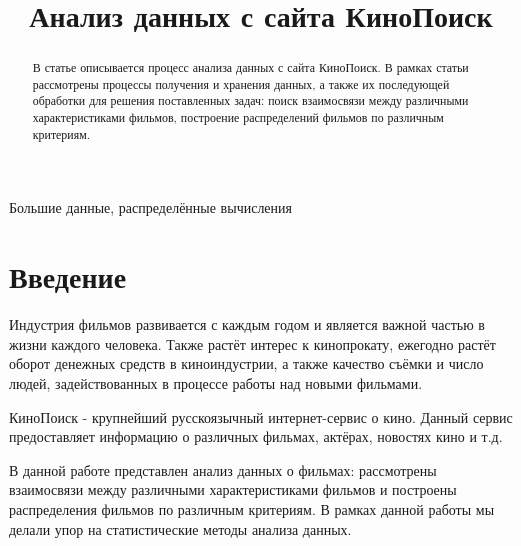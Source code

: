 \documentclass[9pt,conference]{IEEEtran}
\begin{document}
\title{Анализ данных с сайта КиноПоиск}

\author{
}

\maketitle

\begin{abstract}
В статье описывается процесс анализа данных с сайта КиноПоиск. В рамках статьи рассмотрены процессы получения и хранения данных, а также их последующей обработки для решения поставленных задач: поиск взаимосвязи между различными характеристиками фильмов, построение распределений фильмов по различным критериям.
\end{abstract}

\begin{IEEEkeywords}
Большие данные, распределённые вычисления
\end{IEEEkeywords}

\section{Введение}

Индустрия фильмов развивается с каждым годом и является важной частью в жизни каждого человека. Также растёт интерес к кинопрокату, ежегодно растёт оборот денежных средств в киноиндустрии, а также качество съёмки и число людей, задействованных в процессе работы над новыми фильмами.

КиноПоиск - крупнейший русскоязычный интернет-сервис о кино. Данный сервис предоставляет информацию о различных фильмах, актёрах, новостях кино и т.д.

В данной работе представлен анализ данных о фильмах: рассмотрены взаимосвязи между 
различными характеристиками фильмов и построены распределения фильмов по различным критериям. В рамках данной работы мы делали упор на статистические методы анализа данных.
\end{document}
